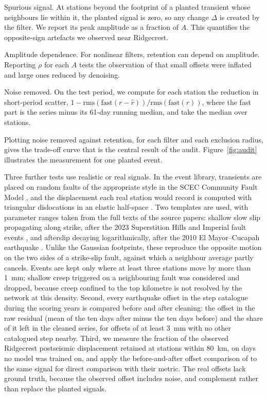 \documentclass[11pt,a4paper]{article}
\begin{document}
Spurious signal. At stations beyond the footprint of a planted transient whose neighbours lie within it, the planted signal is zero, so any change $\Delta$ is created by the filter. We report its peak amplitude as a fraction of $A$. This quantifies the opposite-sign artefacts we observed near Ridgecrest.

Amplitude dependence. For nonlinear filters, retention can depend on amplitude. Reporting $\rho$ for each $A$ tests the observation of \citet{bachelot2025} that small offsets were inflated and large ones reduced by denoising.

Noise removed. On the test period, we compute for each station the reduction in short-period scatter, $1 - \mathrm{rms}(\mathrm{fast}(r - \hat{r})) / \mathrm{rms}(\mathrm{fast}(r))$, where the fast part is the series minus its 61-day running median, and take the median over stations.

Plotting noise removed against retention, for each filter and each exclusion radius, gives the trade-off curve that is the central result of the audit. Figure~\ref{fig:audit} illustrates the measurement for one planted event.

Three further tests use realistic or real signals. In the event library, transients are placed on random faults of the appropriate style in the SCEC Community Fault Model \citep{plesch2007,plesch2024cfm}, and the displacement each real station would record is computed with triangular dislocations in an elastic half-space \citep{nikkhoo2015}. Two templates are used, with parameter ranges taken from the full texts of the source papers: shallow slow slip propagating along strike, after the 2023 Superstition Hills and Imperial fault events \citep{materna2024,vavra2024}, and afterslip decaying logarithmically, after the 2010 El Mayor--Cucapah earthquake \citep{gonzalezortega2014}. Unlike the Gaussian footprints, these reproduce the opposite motion on the two sides of a strike-slip fault, against which a neighbour average partly cancels. Events are kept only where at least three stations move by more than 1~mm; shallow creep triggered on a neighbouring fault \citep{ramos2020,xu2020} was considered and dropped, because creep confined to the top kilometre is not resolved by the network at this density. Second, every earthquake offset in the step catalogue during the scoring years is compared before and after cleaning: the offset in the raw residual (mean of the ten days after minus the ten days before) and the share of it left in the cleaned series, for offsets of at least 3~mm with no other catalogued step nearby. Third, we measure the fraction of the observed Ridgecrest postseismic displacement retained at stations within 80~km, on days no model was trained on, and apply the before-and-after offset comparison of \citet{bachelot2025} to the same signal for direct comparison with their metric. The real offsets lack ground truth, because the observed offset includes noise, and complement rather than replace the planted signals.
\end{document}
